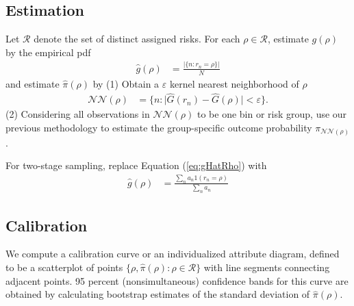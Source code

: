 \documentclass[11pt]{article}
\begin{document}
\subsection{Estimation}

Let $\mathcal{R}$ denote the set of distinct assigned risks.  For
each $\rho \in \mathcal{R}$, estimate $g(\rho)$ by the empirical pdf 
\begin{align}
\hat{g}(\rho) & = \frac{\big| \{n: r_n = \rho\} \big|}{N} \label{eq:gHatRho}
\end{align}
and estimate $\hat{\pi}(\rho)$ by 
(1) Obtain a $\varepsilon$ kernel nearest neighborhood of $\rho$
\begin{align}
\mathcal{NN}(\rho) & = \bigg\{ n: \big| \hat{G}(r_n) - \hat{G}(\rho) \big| <
\varepsilon \bigg\}.
\end{align}
(2) Considering all observations in $\mathcal{NN}(\rho)$ to be one bin or
risk group, use our previous methodology to estimate the
group-specific outcome probability $\pi_{\mathcal{NN}(\rho)}$.



For two-stage sampling, replace Equation (\ref{eq:gHatRho}) with
\begin{align}
\hat{g}(\rho) & = \frac{\sum_n a_n 1(r_n = \rho)}{\sum_n a_n}
\end{align}

\subsection{Calibration}

We compute a calibration curve or an individualized attribute diagram,
defined to be a scatterplot of points $\{\rho, \hat{\pi}(\rho) : \rho
\in \mathcal{R} \}$ with line segments connecting adjacent points.  95
percent (nonsimultaneous) confidence bands for this curve are obtained
by calculating bootstrap estimates of the standard deviation of
$\hat{\pi}(\rho)$. 
\end{document}
